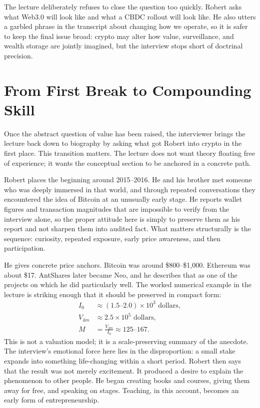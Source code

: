 The lecture deliberately refuses to close the question too quickly. Robert asks what Web3.0 will look like and what a CBDC rollout will look like. He also utters a garbled phrase in the transcript about changing how we operate, so it is safer to keep the final issue broad: crypto may alter how value, surveillance, and wealth storage are jointly imagined, but the interview stops short of doctrinal precision.

\section{From First Break to Compounding Skill}

Once the abstract question of value has been raised, the interviewer brings the lecture back down to biography by asking what got Robert into crypto in the first place. This transition matters. The lecture does not want theory floating free of experience; it wants the conceptual section to be anchored in a concrete path.

Robert places the beginning around 2015--2016. He and his brother met someone who was deeply immersed in that world, and through repeated conversations they encountered the idea of Bitcoin at an unusually early stage. He reports wallet figures and transaction magnitudes that are impossible to verify from the interview alone, so the proper attitude here is simply to preserve them as his report and not sharpen them into audited fact. What matters structurally is the sequence: curiosity, repeated exposure, early price awareness, and then participation.

He gives concrete price anchors. Bitcoin was around \$800--\$1{,}000. Ethereum was about \$17. AntShares later became Neo, and he describes that as one of the projects on which he did particularly well. The worked numerical example in the lecture is striking enough that it should be preserved in compact form:
\begin{align}
I_0 &\approx (1.5\text{--}2.0)\times 10^3 \text{ dollars},\\
V_{4m} &\approx 2.5\times 10^5 \text{ dollars},\\
M &= \frac{V_{4m}}{I_0} \approx 125\text{--}167.
\end{align}
This is not a valuation model; it is a scale-preserving summary of the anecdote. The interview's emotional force here lies in the disproportion: a small stake expands into something life-changing within a short period. Robert then says that the result was not merely excitement. It produced a desire to explain the phenomenon to other people. He began creating books and courses, giving them away for free, and speaking on stages. Teaching, in this account, becomes an early form of entrepreneurship.

